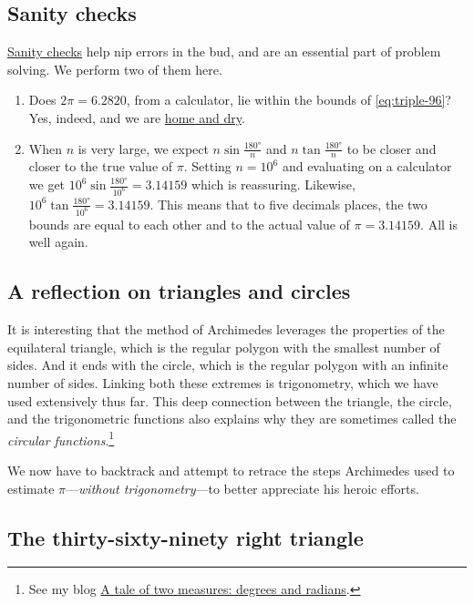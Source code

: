 \documentclass[
  a4paper,
]{article}
\begin{document}
\subsection{Sanity checks}\label{sanity-checks}

\href{https://en.wiktionary.org/wiki/sanity_check}{Sanity checks} help
nip errors in the bud, and are an essential part of problem solving. We
perform two of them here.

\begin{enumerate}
\item
  Does \(2\pi = 6.2820\), from a calculator, lie within the bounds of
  \cref{eq:triple-96}? Yes, indeed, and we are
  \href{https://dictionary.cambridge.org/dictionary/english/be-home-and-dry}{home
  and dry}.
\item
  When \(n\) is very large, we expect \(n\sin\frac{180°}{n}\) and
  \(n\tan\frac{180°}{n}\) to be closer and closer to the true value of
  \(\pi\). Setting \(n = 10^6\) and evaluating on a calculator we get
  \(10^6\sin\frac{180°}{10^6} = 3.14159\) which is reassuring. Likewise,
  \(10^6\tan\frac{180°}{10^6} = 3.14159\). This means that to five
  decimals places, the two bounds are equal to each other and to the
  actual value of \(\pi = 3.14159\). All is well again.
\end{enumerate}

\subsection{A reflection on triangles and
circles}\label{a-reflection-on-triangles-and-circles}

It is interesting that the method of Archimedes leverages the properties
of the equilateral triangle, which is the regular polygon with the
smallest number of sides. And it ends with the circle, which is the
regular polygon with an infinite number of sides. Linking both these
extremes is trigonometry, which we have used extensively thus far. This
deep connection between the triangle, the circle, and the trigonometric
functions also explains why they are sometimes called the \emph{circular
functions}.\footnote{See my blog
  \href{https://swanlotus.netlify.app/blogs/a-tale-of-two-measures-degrees-and-radians}{A
  tale of two measures: degrees and radians}.}

We now have to backtrack and attempt to retrace the steps Archimedes
used to estimate \(\pi\)---\emph{without trigonometry}---to better
appreciate his heroic efforts.

\subsection{The thirty-sixty-ninety right
triangle}\label{the-thirty-sixty-ninety-right-triangle}
\end{document}
